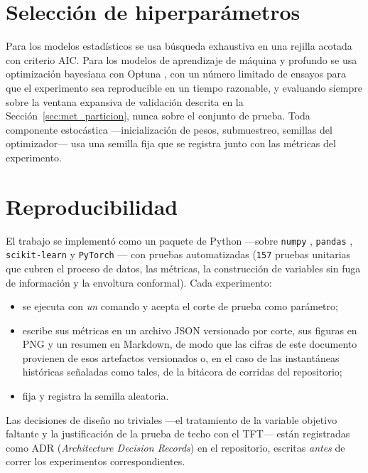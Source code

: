 \section{Selección de hiperparámetros}
\label{sec:met_hiperparametros}

Para los modelos estadísticos se usa búsqueda exhaustiva en una rejilla acotada con criterio
AIC. Para los modelos de aprendizaje de máquina y profundo se usa optimización bayesiana con
Optuna \citep{akiba2019}, con un número limitado de ensayos para que el experimento sea
reproducible en un tiempo razonable, y evaluando siempre sobre la ventana expansiva de
validación descrita en la Sección~\ref{sec:met_particion}, nunca sobre el conjunto de prueba.
Toda componente estocástica ---inicialización de pesos, submuestreo, semillas del optimizador---
usa una semilla fija que se registra junto con las métricas del experimento.

\section{Reproducibilidad}
\label{sec:met_reproducibilidad}

El trabajo se implementó como un paquete de Python ---sobre \texttt{numpy} \citep{harris2020}, \texttt{pandas} \citep{mckinney2010}, \texttt{scikit-learn} \citep{pedregosa2011} y \texttt{PyTorch} \citep{paszke2019}--- con pruebas automatizadas
(\texttt{157} pruebas unitarias que cubren el proceso de datos, las métricas, la construcción
de variables sin fuga de información y la envoltura conformal). Cada experimento:

\begin{itemize}
  \item se ejecuta con \emph{un} comando y acepta el corte de prueba como parámetro;
  \item escribe sus métricas en un archivo JSON versionado por corte, sus figuras en PNG y un
  resumen en Markdown, de modo que las cifras de este documento provienen de esos artefactos versionados o, en el caso de las instantáneas históricas señaladas como tales, de la bitácora de corridas del repositorio;
  \item fija y registra la semilla aleatoria.
\end{itemize}

Las decisiones de diseño no triviales ---el tratamiento de la variable objetivo faltante y la
justificación de la prueba de techo con el TFT--- están registradas como ADR (\emph{Architecture
Decision Records}) en el repositorio, escritas \emph{antes} de correr los experimentos
correspondientes.
